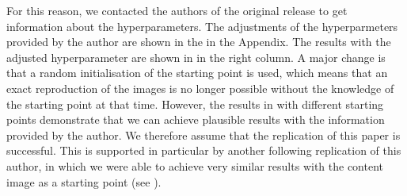 For this reason, we contacted the authors of the original release to get information about the hyperparameters. The adjustments of the hyperparmeters provided by the author are shown in the  in the Appendix. The results with the adjusted hyperparameter are shown in  in the right column. A major change is that a random initialisation of the starting point is used, which means that an exact reproduction of the images is no longer possible without the knowledge of the starting point at that time. However, the results in  with different starting points demonstrate that we can achieve plausible results with the information provided by the author. We therefore assume that the replication of this paper is successful. This is supported in particular by another following replication of this author, in which we were able to achieve very similar results with the content image as a starting point (see ).
